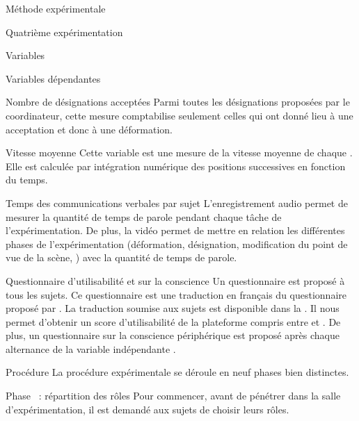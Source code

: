 \documentclass[myfrancais,ngerman,english,frenchb]{mythesis}
\begin{document}
\begin{mychapter}{Méthode expérimentale}
\begin{mysection}{Quatrième expérimentation}
\begin{mysubsection}{Variables}
\begin{mysubsubsection}{Variables dépendantes}
					\begin{myparagraph}{ Nombre de désignations acceptées}
						Parmi toutes les désignations proposées par le coordinateur, cette mesure comptabilise seulement celles qui ont donné lieu à une acceptation et donc à une déformation.
					\end{myparagraph}
					\begin{myparagraph}{ Vitesse moyenne}
						Cette variable est une mesure de la vitesse moyenne de chaque .
						Elle est calculée par intégration numérique des positions successives en fonction du temps.
					\end{myparagraph}
					\begin{myparagraph}{ Temps des communications verbales par sujet}
						L'enregistrement audio permet de mesurer la quantité de temps de parole pendant chaque tâche de l'expérimentation.
						De plus, la vidéo permet de mettre en relation les différentes phases de l'expérimentation (déformation, désignation, modification du point de vue de la scène, \myetc) avec la quantité de temps de parole.
					\end{myparagraph}
					\begin{myparagraph}{ Questionnaire d'utilisabilité et sur la conscience}
						Un questionnaire est proposé à tous les sujets.
						Ce questionnaire est une traduction en français du questionnaire  proposé par .
						La traduction soumise aux sujets est disponible dans la .
						Il nous permet d'obtenir un score d'utilisabilité de la plateforme compris entre  et .
						De plus, un questionnaire sur la conscience périphérique est proposé après chaque alternance de la variable indépendante .
					\end{myparagraph}
				\end{mysubsubsection}
			\end{mysubsection}
			\begin{mysubsection}{Procédure}
				La procédure expérimentale se déroule en neuf phases bien distinctes.
				\begin{myparagraph}{Phase~ : répartition des rôles}
					Pour commencer, avant de pénétrer dans la salle d'expérimentation, il est demandé aux sujets de choisir leurs rôles.

\end{myparagraph}
\end{mysubsection}
\end{mysection}
\end{mychapter}
\end{document}

